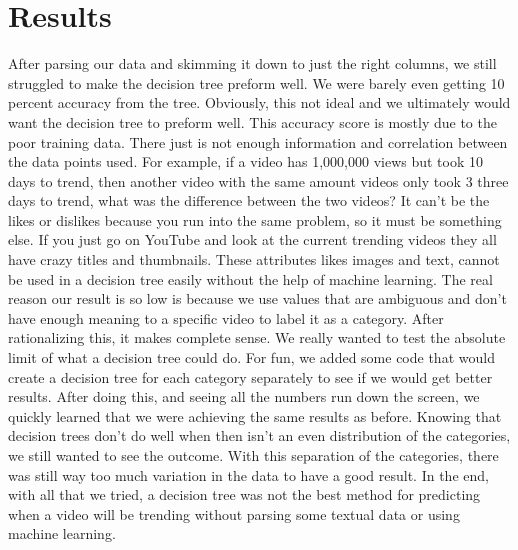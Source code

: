 \documentclass{article}
\begin{document}
\section*{Results}
\par
    After parsing our data and skimming it down to just the right columns, we still struggled to make the decision tree preform well.
We were barely even getting 10 percent accuracy from the tree.
Obviously, this not ideal and we ultimately would want the decision tree to preform well. 
This accuracy score is mostly due to the poor training data.
There just is not enough information and correlation between the data points used.
For example, if a video has 1,000,000 views but took 10 days to trend, then another video with the same amount videos only took 3 three days to trend, what was the difference between the two videos?
It can't be the likes or dislikes because you run into the same problem, so it must be something else. 
If you just go on YouTube and look at the current trending videos they all have crazy titles and thumbnails. 
These attributes likes images and text, cannot be used in a decision tree easily without the help of machine learning. 
The real reason our result is so low is because we use values that are ambiguous and don't have enough meaning to a specific video to label it as a category.
After rationalizing this, it makes complete sense.
We really wanted to test the absolute limit of what a decision tree could do.
For fun, we added some code that would create a decision tree for each category separately to see if we would get better results.
After doing this, and seeing all the numbers run down the screen, we quickly learned that we were achieving the same results as before.
Knowing that decision trees don't do well when then isn't an even distribution of the categories, we still wanted to see the outcome.
With this separation of the categories, there was still way too much variation in the data to have a good result. 
In the end, with all that we tried, a decision tree was not the best method for predicting when a video will be trending without parsing some textual data or using machine learning.
\end{document}
